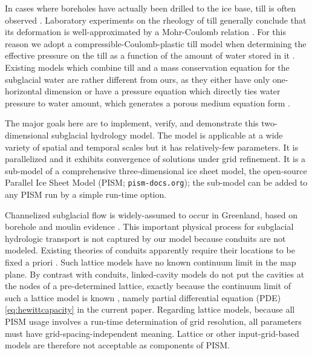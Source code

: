 \documentclass[gmd]{copernicus}   %
\begin{document}
In cases where boreholes have actually been drilled to the ice base, till is often observed \citep{Hookeetal1997,Tulaczyketal2000,TrufferHarrisonEchelmeyer2000,TrufferHarrison2006}.  Laboratory experiments on the rheology of till \citep{Kamb1991,Hookeetal1997,Tulaczyketal2000,TrufferEchelmeyerHarrison2001} generally conclude that its deformation is well-approximated by a Mohr-Coulomb relation \citep{SchoofTill}.  For this reason we adopt a compressible-Coulomb-plastic till model when determining the effective pressure on the till as a function of the amount of water stored in it \citep{Tulaczyketal2000}.  Existing models which combine till and a mass conservation equation for the subglacial water are rather different from ours, as they either have only one-horizontal dimension \citep{vanderWeletal2013} or have a pressure equation which directly ties water pressure to water amount, which generates a porous medium equation form \citep{FlowersClarke2002_theory,deFleurianetal2014}.

The major goals here are to implement, verify, and demonstrate this two-dimensional subglacial hydrology model.  The model is applicable at a wide variety of spatial and temporal scales but it has relatively-few parameters.  It is parallelized and it exhibits convergence of solutions under grid refinement.  It is a sub-model of a comprehensive three-dimensional ice sheet model, the open-source Parallel Ice Sheet Model (PISM; \texttt{pism-docs.org}); the sub-model can be added to any PISM run by a simple run-time option.

Channelized subglacial flow is widely-assumed to occur in Greenland, based on borehole and moulin evidence \citep[for example]{Andrewsetal2014}.  This important physical process for subglacial hydrologic transport is not captured by our model because conduits are not modeled.  Existing theories of conduits apparently require their locations to be fixed a priori \citep{Schoofmeltsupply,Hewitt2013,Werderetal2013}.  Such lattice models have no known continuum limit in the map plane.  By contrast with conduits, linked-cavity models do not put the cavities at the nodes of a pre-determined lattice, exactly because the continuum limit of such a lattice model is known \citep{Hewitt2011}, namely partial differential equation (PDE) \eqref{eq:hewittcapacity} in the current paper.  Regarding lattice models, because all PISM usage involves a run-time determination of grid resolution, all parameters must have grid-spacing-independent meaning.  Lattice or other input-grid-based models are therefore not acceptable as components of PISM.
\end{document}
